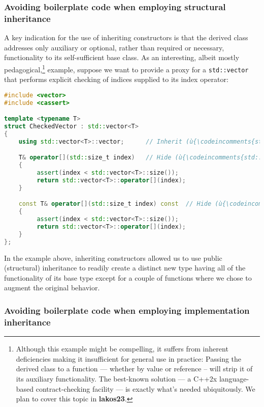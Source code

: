 \subsubsection[Avoiding boilerplate code when employing structural inheritance]{Avoiding boilerplate code when employing structural inheritance}\label{avoiding-boilerplate-code-code-when-employing-structural-inheritance}

A key indication for the use of inheriting constructors is that the
derived class addresses only auxiliary or optional, rather than required
or necessary, functionality to its self-sufficient base class. As an
interesting, albeit mostly pedagogical,{\cprotect\footnote{Although this
example might be compelling, it suffers from inherent deficiencies
making it insufficient for general use in practice: Passing the
derived class to a function --- whether by value or reference -- will
strip it of its auxiliary functionality. The best-known solution --- a
C++2x language-based contract-checking facility --- is exactly what's
  needed ubiquitously. We plan to cover this topic in \textbf{lakos23}.}} example, suppose we
want to provide a proxy for a \texttt{std::vector} that performs
explicit checking of indices supplied to its index operator:

\begin{lstlisting}[language=C++]
#include <vector>
#include <cassert>

template <typename T>
struct CheckedVector : std::vector<T>
{
    using std::vector<T>::vector;      // Inherit (ù{\codeincomments{std::vector}}ù)'s constructors.

    T& operator[](std::size_t index)   // Hide (ù{\codeincomments{std::vector}}ù)'s index operator.
    {
         assert(index < std::vector<T>::size());
         return std::vector<T>::operator[](index);
    }

    const T& operator[](std::size_t index) const  // Hide (ù{\codeincomments{const}}ù) index operator.
    {
         assert(index < std::vector<T>::size());
         return std::vector<T>::operator[](index);
    }
};
\end{lstlisting}

\noindent In the example above, inheriting constructors allowed us to use public
(structural) inheritance to readily create a distinct new type having
all of the functionality of its base type except for a couple of
functions where we chose to augment the original behavior.

\subsubsection[Avoiding boilerplate code when employing implementation inheritance]{Avoiding boilerplate code when employing implementation inheritance}\label{avoiding-boilerplate-code-when-employing-implementation-inheritance}

